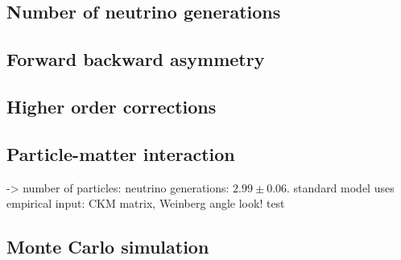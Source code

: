 \subsection{Number of neutrino generations}
\label{sub:number_of_neutrino_generations}



\subsection{Forward backward asymmetry}
\label{sub:forward_backward_asymmetry}

\subsection{Higher order corrections}
\subsection{Particle-matter interaction}
-> number of particles: neutrino generations: $2.99 \pm 0.06$. 
standard model uses empirical input: CKM matrix, Weinberg angle
look!\cite{pdg} test
\subsection{Monte Carlo simulation}
\label{sub:monte_carlo_simulation}


